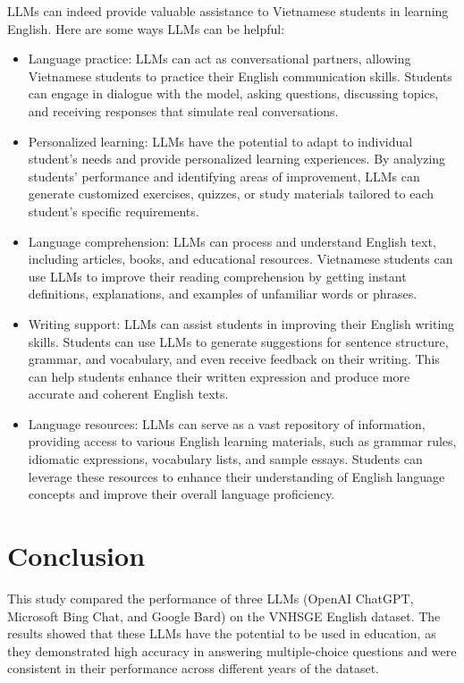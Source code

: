 \documentclass[11pt]{article}
\begin{document}
LLMs can indeed provide valuable assistance to Vietnamese students in learning English. Here are some ways LLMs can be helpful:

\begin{itemize}
	\item Language practice: LLMs can act as conversational partners, allowing Vietnamese students to practice their English communication skills. Students can engage in dialogue with the model, asking questions, discussing topics, and receiving responses that simulate real conversations. 
	
	\item Personalized learning: LLMs have the potential to adapt to individual student's needs and provide personalized learning experiences. By analyzing students' performance and identifying areas of improvement, LLMs can generate customized exercises, quizzes, or study materials tailored to each student's specific requirements.
	
	\item Language comprehension: LLMs can process and understand English text, including articles, books, and educational resources. Vietnamese students can use LLMs to improve their reading comprehension by getting instant definitions, explanations, and examples of unfamiliar words or phrases.
	
	\item Writing support: LLMs can assist students in improving their English writing skills. Students can use LLMs to generate suggestions for sentence structure, grammar, and vocabulary, and even receive feedback on their writing. This can help students enhance their written expression and produce more accurate and coherent English texts.
	
	\item Language resources: LLMs can serve as a vast repository of information, providing access to various English learning materials, such as grammar rules, idiomatic expressions, vocabulary lists, and sample essays. Students can leverage these resources to enhance their understanding of English language concepts and improve their overall language proficiency.
\end{itemize}



\section{Conclusion}

This study compared the performance of three LLMs (OpenAI ChatGPT, Microsoft Bing Chat, and Google Bard) on the VNHSGE English dataset. The results showed that these LLMs have the potential to be used in education, as they demonstrated high accuracy in answering multiple-choice questions and were consistent in their performance across different years of the dataset. 
\end{document}
